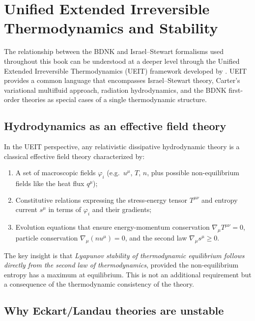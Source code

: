 \section{Unified Extended Irreversible Thermodynamics and Stability}
\label{sec:ueit-stability}

The relationship between the BDNK and Israel--Stewart formalisms used
throughout this book can be understood at a deeper level through the
Unified Extended Irreversible Thermodynamics (UEIT) framework developed
by \citet{GavassinoUEIT2021}.  UEIT provides a common language that
encompasses Israel--Stewart theory, Carter's variational multifluid
approach, radiation hydrodynamics, and the BDNK first-order theories
as special cases of a single thermodynamic structure.

\subsection{Hydrodynamics as an effective field theory}
\label{subsec:hydro-eft}

In the UEIT perspective, any relativistic dissipative hydrodynamic theory
is a classical effective field theory characterized by:
\begin{enumerate}
  \item A set of macroscopic fields $\varphi_i$ (e.g.\ $u^\mu$, $T$, $n$,
    plus possible non-equilibrium fields like the heat flux $q^\mu$);
  \item Constitutive relations expressing the stress-energy tensor
    $T^{\mu\nu}$ and entropy current $s^\mu$ in terms of $\varphi_i$
    and their gradients;
  \item Evolution equations that ensure energy-momentum conservation
    $\nabla_\mu T^{\mu\nu} = 0$, particle conservation
    $\nabla_\mu(n u^\mu) = 0$, and the second law
    $\nabla_\mu s^\mu \ge 0$.
\end{enumerate}
The key insight is that \emph{Lyapunov stability of thermodynamic
equilibrium follows directly from the second law of thermodynamics},
provided the non-equilibrium entropy has a maximum at equilibrium.
This is not an additional requirement but a consequence of the
thermodynamic consistency of the theory.

\subsection{Why Eckart/Landau theories are unstable}
\label{subsec:eckart-instability-ueit}

